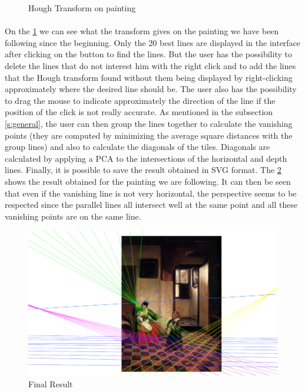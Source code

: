 \documentclass[11pt]{article}
\begin{document}
\begin{figure}[h]
		\caption{Hough Transform on painting}
		\label{im:hough}
	\end{figure}

	\paragraph{}
	On the \figurename \ref{im:hough} we can see what the transform gives on the painting we have been following since the beginning. Only the 20 best lines are displayed in the interface after clicking on the button to find the lines. But the user has the possibility to delete the lines that do not interest him with the right click and to add the lines that the Hough transform found without them being displayed by right-clicking approximately where the desired line should be. The user also has the possibility to drag the mouse to indicate approximately the direction of the line if the position of the click is not really accurate. As mentioned in the subsection \ref{s:general}, the user can then group the lines together to calculate the vanishing points (they are computed by minimizing the average square distances with the group lines) and also to calculate the diagonals of the tiles. Diagonals are calculated by applying a PCA \cite{pca} to the intersections of the horizontal and depth lines. Finally, it is possible to save the result obtained in SVG format. The \figurename \ref{im:final} shows the result obtained for the painting we are following. It can then be seen that even if the vanishing line is not very horizontal, the perspective seems to be respected since the parallel lines all intersect well at the same point and all these vanishing points are on the same line.
	
	\begin{figure}[h]
		\centering
		\includegraphics[scale=1.9]{final.png}
		\caption{Final Result}
		\label{im:final}
	\end{figure}
\end{document}

